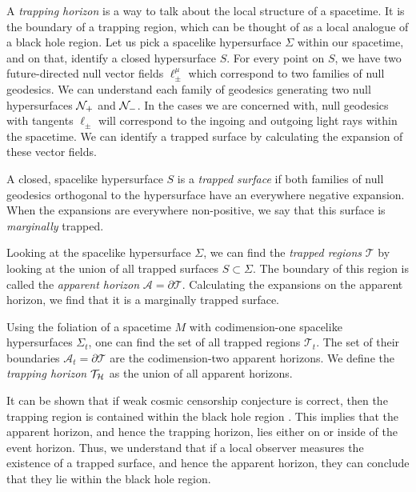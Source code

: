 A \emph{trapping horizon} is a way to talk about the local structure of a spacetime. It is the boundary of a trapping region, which can be thought of as a local analogue of a black hole region. Let us pick a spacelike hypersurface $\Sigma$ within our spacetime, and on that, identify a closed hypersurface $S$. For every point on $S$, we have two future-directed null vector fields $\ell^\mu_\pm$ which correspond to two families of null geodesics. We can understand each family of geodesics generating two null hypersurfaces ${\cal N}_+$ and ${\cal N}_-$. In the cases we are concerned with, null geodesics with tangents $\ell_\pm$ will correspond to the ingoing and outgoing light rays within the spacetime. We can identify a trapped surface by calculating the expansion of these vector fields.

\begin{defn}
A closed, spacelike hypersurface $S$ is a \emph{trapped surface} if both families of null geodesics orthogonal to the hypersurface have an everywhere negative expansion. When the expansions are everywhere non-positive, we say that this surface is \emph{marginally} trapped.
\end{defn}

Looking at the spacelike hypersurface $\Sigma$, we can find the \emph{trapped regions} $\mathcal{T}$ by looking at the union of all trapped surfaces $S \subset \Sigma$. The boundary of this region is called the \emph{apparent horizon} $\mathcal{A} = \partial \mathcal{T}$. Calculating the expansions on the apparent horizon, we find that it is a marginally trapped surface.

\begin{defn}
Using the foliation of a spacetime $M$ with codimension-one spacelike hypersurfaces $\Sigma_t$, one can find the set of all trapped regions $\mathcal{T}_t$. The set of their boundaries $\mathcal{A}_t = \partial \mathcal{T}$ are the codimension-two apparent horizons. We define the \emph{trapping horizon} $\mathcal{T}_{{\cal H}}$ as the union of all apparent horizons. 
\end{defn}

It can be shown that if weak cosmic censorship conjecture is correct, then the trapping region is contained within the black hole region \cite{Hawking:1973uf}. This implies that the apparent horizon, and hence the trapping horizon, lies either on or inside of the event horizon. Thus, we understand that if a local observer measures the existence of a trapped surface, and hence the apparent horizon, they can conclude that they lie within the black hole region.


